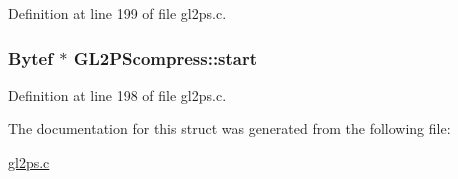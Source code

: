 Definition at line 199 of file gl2ps.\+c.

\hypertarget{struct_g_l2_p_scompress_a011ba6d566d5a2b147fe3f43f0ed6f35}{}
\subsubsection[{start}]{\setlength{\rightskip}{0pt plus 5cm}Bytef $\ast$ G\+L2\+P\+Scompress\+::start}\label{struct_g_l2_p_scompress_a011ba6d566d5a2b147fe3f43f0ed6f35}


Definition at line 198 of file gl2ps.\+c.



The documentation for this struct was generated from the following file\+:\begin{DoxyCompactItemize}
\item 
\hyperlink{gl2ps_8c}{gl2ps.\+c}\end{DoxyCompactItemize}
